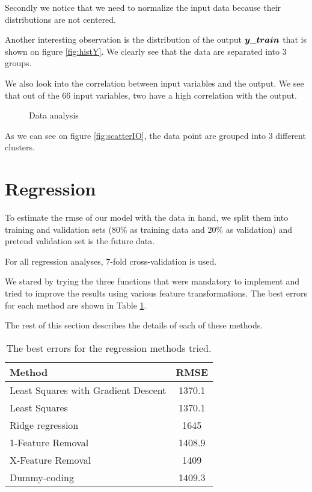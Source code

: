 \documentclass{article} %
\begin{document}
Secondly we notice that we need to normalize the input data because their distributions are not centered.

Another interesting observation is the distribution of the output $\boldmath{y\_train}$ that is shown on figure \ref{fig:histY}.
We clearly see that the data are separated into 3 groups.

We also look into the correlation between input variables and the output. We see that out of the 66 input variables, two have a high correlation with the output.
\begin{figure}[!t]
	\centering
	\caption{Data analysis}
\end{figure}
As we can see on figure \ref{fig:scatterIO}, the data point are grouped into 3 different clusters.


\section{Regression}
To  estimate the rmse of our model with the data in hand, we split them into training and validation sets (80\% as training data and 20\% as validation) and pretend validation set is the future data.

For all regression analyses, 7-fold cross-validation is used.

We stared by trying the three functions that were mandatory to implement and tried to improve the results using various feature transformations. The best errors for each method are shown in Table \ref{tab:regression-errors}.

The rest of this section describes the details of each of these methods.
\begin{table}[h]
	\begin{center}
		\begin{tabular}{l|c}
			Method & RMSE  \\
			\hline
			Least Squares with Gradient Descent & 1370.1   \\
			Least Squares & 1370.1  \\
			Ridge regression &  1645 \\
			1-Feature Removal &  1408.9 \\
			X-Feature Removal &  1409 \\
			Dummy-coding &  1409.3 \\
		\end{tabular}
		\caption{The best errors for the regression methods tried.}
		\label{tab:regression-errors}
	\end{center}
\end{table}
\end{document}
